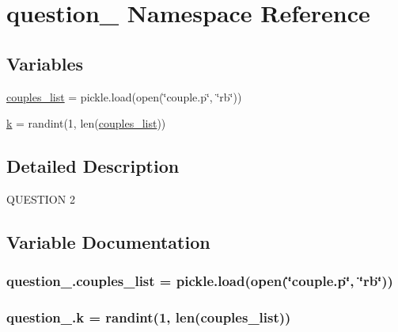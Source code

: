 \hypertarget{namespacequestion__2}{}\section{question\+\_ Namespace Reference}
\label{namespacequestion__2}
\subsection*{Variables}
\begin{DoxyCompactItemize}
\item 
\hyperlink{namespacequestion__2_a943836f0c535fc58a20da3381b87ea1b}{couples\+\_\+list} = pickle.\+load(open(\char`\"{}couple.\+p\char`\"{}, \char`\"{}rb\char`\"{}))
\item 
\hyperlink{namespacequestion__2_a9e1016bdca0ffec0f0a73013cc28152a}{k} = randint(1, len(\hyperlink{namespacequestion__2_a943836f0c535fc58a20da3381b87ea1b}{couples\+\_\+list}))
\end{DoxyCompactItemize}


\subsection{Detailed Description}
\begin{DoxyVerb}QUESTION 2\end{DoxyVerb}
 

\subsection{Variable Documentation}
\subsubsection[{\texorpdfstring{couples\+\_\+list}{couples_list}}]{\setlength{\rightskip}{0pt plus 5cm}question\+\_.\+couples\+\_\+list = pickle.\+load(open(\char`\"{}couple.\+p\char`\"{}, \char`\"{}rb\char`\"{}))}\hypertarget{namespacequestion__2_a943836f0c535fc58a20da3381b87ea1b}{}\label{namespacequestion__2_a943836f0c535fc58a20da3381b87ea1b}
\subsubsection[{\texorpdfstring{k}{k}}]{\setlength{\rightskip}{0pt plus 5cm}question\+\_.\+k = randint(1, len({\bf couples\+\_\+list}))}\hypertarget{namespacequestion__2_a9e1016bdca0ffec0f0a73013cc28152a}{}\label{namespacequestion__2_a9e1016bdca0ffec0f0a73013cc28152a}
